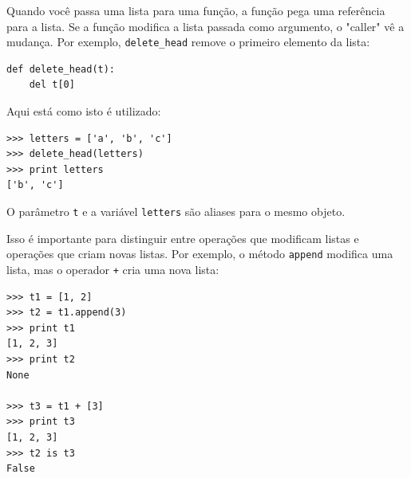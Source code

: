
Quando você passa uma lista para uma função, a função pega uma referência para a lista.
Se a função modifica a lista passada como argumento, o "caller" vê a mudança.
Por exemplo, \verb"delete_head" remove o primeiro elemento da lista:



\beforeverb
\begin{verbatim}
def delete_head(t):
    del t[0]
\end{verbatim}
\afterverb
%
Aqui está como isto é utilizado:


\beforeverb
\begin{verbatim}
>>> letters = ['a', 'b', 'c']
>>> delete_head(letters)
>>> print letters
['b', 'c']
\end{verbatim}
\afterverb
%
O parâmetro {\tt t} e a variável {\tt letters} são aliases para o mesmo objeto.


Isso é importante para distinguir entre operações que modificam listas e operações que criam novas listas.
Por exemplo, o método {\tt append} modifica uma lista, mas o operador {\tt +} cria uma nova lista:





\beforeverb
\begin{verbatim}
>>> t1 = [1, 2]
>>> t2 = t1.append(3)
>>> print t1
[1, 2, 3]
>>> print t2
None

>>> t3 = t1 + [3]
>>> print t3
[1, 2, 3]
>>> t2 is t3
False
\end{verbatim}
\afterverb

